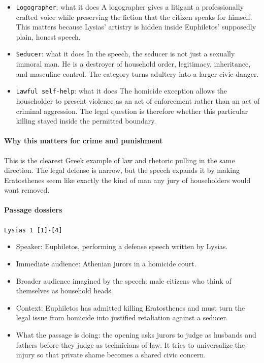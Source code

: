 \documentclass[11pt]{article}
\begin{document}
\begin{itemize}
\item \texttt{Logographer}: what it does A logographer gives a litigant a professionally crafted voice while preserving the fiction that the citizen speaks for himself. This matters because Lysias' artistry is hidden inside Euphiletos' supposedly plain, honest speech.
\item \texttt{Seducer}: what it does In the speech, the seducer is not just a sexually immoral man. He is a destroyer of household order, legitimacy, inheritance, and masculine control. The category turns adultery into a larger civic danger.
\item \texttt{Lawful self-help}: what it does The homicide exception allows the householder to present violence as an act of enforcement rather than an act of criminal aggression. The legal question is therefore whether this particular killing stayed inside the permitted boundary.
\end{itemize}

\paragraph{Why this matters for crime and punishment}

This is the clearest Greek example of law and rhetoric pulling in the same direction. The legal defense is narrow, but the speech expands it by making Eratosthenes seem like exactly the kind of man any jury of householders would want removed.

\paragraph{Passage dossiers}

\texttt{Lysias 1 [1]-[4]}

\begin{itemize}
\item Speaker: Euphiletos, performing a defense speech written by Lysias.
\item Immediate audience: Athenian jurors in a homicide court.
\item Broader audience imagined by the speech: male citizens who think of themselves as household heads.
\item Context: Euphiletos has admitted killing Eratosthenes and must turn the legal issue from homicide into justified retaliation against a seducer.
\item What the passage is doing: the opening asks jurors to judge as husbands and fathers before they judge as technicians of law. It tries to universalize the injury so that private shame becomes a shared civic concern.
\end{itemize}
\end{document}
